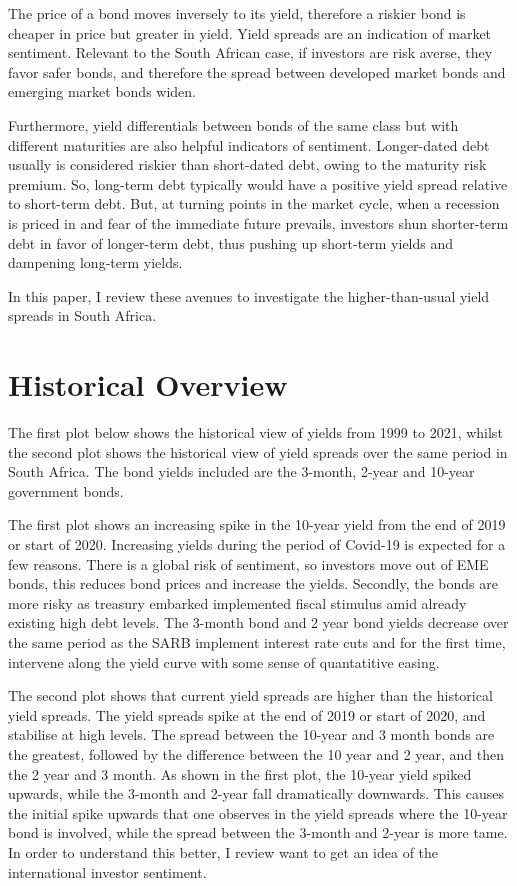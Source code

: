 \documentclass[11pt,preprint, authoryear]{elsarticle}
\numberwithin{equation}{section}
\numberwithin{figure}{section}
\numberwithin{table}{section}
\begin{document}
The price of a bond moves inversely to its yield, therefore a riskier
bond is cheaper in price but greater in yield. Yield spreads are an
indication of market sentiment. Relevant to the South African case, if
investors are risk averse, they favor safer bonds, and therefore the
spread between developed market bonds and emerging market bonds widen.

Furthermore, yield differentials between bonds of the same class but
with different maturities are also helpful indicators of sentiment.
Longer-dated debt usually is considered riskier than short-dated debt,
owing to the maturity risk premium. So, long-term debt typically would
have a positive yield spread relative to short-term debt. But, at
turning points in the market cycle, when a recession is priced in and
fear of the immediate future prevails, investors shun shorter-term debt
in favor of longer-term debt, thus pushing up short-term yields and
dampening long-term yields.

In this paper, I review these avenues to investigate the
higher-than-usual yield spreads in South Africa.

\hypertarget{historical-overview}{%
\section{Historical Overview}\label{historical-overview}}

The first plot below shows the historical view of yields from 1999 to
2021, whilst the second plot shows the historical view of yield spreads
over the same period in South Africa. The bond yields included are the
3-month, 2-year and 10-year government bonds.

The first plot shows an increasing spike in the 10-year yield from the
end of 2019 or start of 2020. Increasing yields during the period of
Covid-19 is expected for a few reasons. There is a global risk of
sentiment, so investors move out of EME bonds, this reduces bond prices
and increase the yields. Secondly, the bonds are more risky as treasury
embarked implemented fiscal stimulus amid already existing high debt
levels. The 3-month bond and 2 year bond yields decrease over the same
period as the SARB implement interest rate cuts and for the first time,
intervene along the yield curve with some sense of quantatitive easing.

The second plot shows that current yield spreads are higher than the
historical yield spreads. The yield spreads spike at the end of 2019 or
start of 2020, and stabilise at high levels. The spread between the
10-year and 3 month bonds are the greatest, followed by the difference
between the 10 year and 2 year, and then the 2 year and 3 month. As
shown in the first plot, the 10-year yield spiked upwards, while the
3-month and 2-year fall dramatically downwards. This causes the initial
spike upwards that one observes in the yield spreads where the 10-year
bond is involved, while the spread between the 3-month and 2-year is
more tame. In order to understand this better, I review want to get an
idea of the international investor sentiment.
\end{document}
